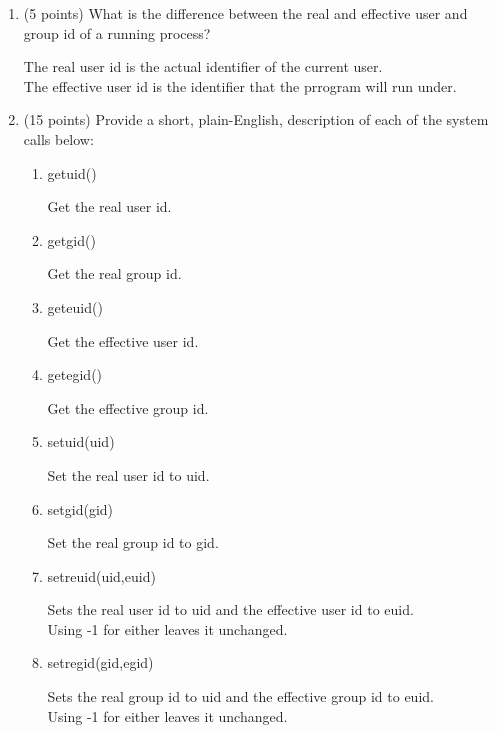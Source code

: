 \documentclass{article}[9pt]
\newenvironment{myanswer}{\begin{mdframed}\begin{answerfont}}{\end{answerfont}\end{mdframed}}
\begin{document}
\begin{enumerate}
\begin{enumerate}
\end{enumerate}
\item (5 points) What is the difference between the real and effective user
and group id of a running process?
\begin{myanswer}
The real user id is the actual identifier of the current user.\\
The effective user id is the identifier that the prrogram will run
under.
\end{myanswer}

\item (15 points) Provide a short, plain-English, description of each of the system
calls below:

\begin{enumerate}
\item getuid()
\begin{myanswer}
Get the real user id.
\end{myanswer}

\item getgid()
\begin{myanswer}
Get the real group id.
\end{myanswer}

\item geteuid()
\begin{myanswer}
Get the effective user id.
\end{myanswer}

\item getegid()
\begin{myanswer}
Get the effective group id.
\end{myanswer}

\item setuid(uid)
\begin{myanswer}
Set the real user id to uid.
\end{myanswer}

\item setgid(gid)
\begin{myanswer}
Set the real group id to gid.
\end{myanswer}

\item setreuid(uid,euid)
\begin{myanswer}
Sets the real user id to uid and the effective user id to euid.\\
Using -1 for either leaves it unchanged.
\end{myanswer}

\item setregid(gid,egid)
\begin{myanswer}
Sets the real group id to uid and the effective group id to euid.\\
Using -1 for either leaves it unchanged.
\end{myanswer}


\end{enumerate}
\end{enumerate}
\end{document}
